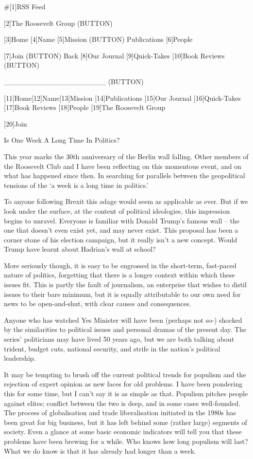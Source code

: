    #[1]RSS Feed

   [2]The Roosevelt Group
   (BUTTON)

   [3]Home [4]Name [5]Mission (BUTTON) Publications [6]People

   [7]Join
   (BUTTON) Back [8]Our Journal [9]Quick-Takes [10]Book Reviews
   (BUTTON)

   ____________________ (BUTTON)

   [11]Home[12]Name[13]Mission [14]Publications [15]Our Journal
   [16]Quick-Takes [17]Book Reviews [18]People
   [19]The Roosevelt Group

   [20]Join

Is One Week A Long Time In Politics?


   This year marks the 30th anniversary of the Berlin wall falling. Other
   members of the Roosevelt Club and I have been reflecting on this
   momentous event, and on what has happened since then. In searching for
   parallels between the geopolitical tensions of the `a week is a long
   time in politics.'

   To anyone following Brexit this adage would seem as applicable as ever.
   But if we look under the surface, at the content of political
   ideologies, this impression begins to unravel. Everyone is familiar
   with Donald Trump's famous wall -- the one that doesn't even exist yet,
   and may never exist. This proposal has been a corner stone of his
   election campaign, but it really isn't a new concept. Would Trump have
   learnt about Hadrian's wall at school?

   More seriously though, it is easy to be engrossed in the short-term,
   fast-paced nature of politics, forgetting that there is a longer
   context within which these issues fit. This is partly the fault of
   journalism, an enterprise that wishes to distil issues to their bare
   minimum, but it is equally attributable to our own need for news to be
   open-and-shut, with clear causes and consequences.

   Anyone who has watched Yes Minister will have been (perhaps not so-)
   shocked by the similarities to political issues and personal dramas of
   the present day. The series' politicians may have lived 50 years ago,
   but we are both talking about trident, budget cuts, national security,
   and strife in the nation's political leadership.

   It may be tempting to brush off the current political trends for
   populism and the rejection of expert opinion as new faces for old
   problems. I have been pondering this for some time, but I can't say it
   is as simple as that. Populism pitches people against elites; conflict
   between the two is deep, and in some cases well-founded. The process of
   globalisation and trade liberalisation initiated in the 1980s has been
   great for big business, but it has left behind some (rather large)
   segments of society. Even a glance at some basic economic indicators
   will tell you that these problems have been brewing for a while. Who
   knows how long populism will last? What we do know is that it has
   already had longer than a week.

